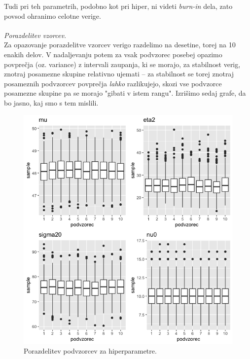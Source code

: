 \documentclass[a4paper,11pt]{article}
\begin{document}
\noindent
Tudi pri teh parametrih, podobno kot pri hiper, ni videti \textit{burn-in} dela, zato povsod ohranimo celotne verige.
\\
\\
\textit{Porazdelitev vzorcev.}
\\
Za opazovanje porazdelitve vzorcev verigo razdelimo na desetine, torej na 10 enakih delov. 
V nadaljevanju potem za vsak podvzorec posebej opazimo povprečja (oz. variance) z intervali zaupanja, ki se morajo, za stabilnost verig, znotraj posamezne skupine relativno ujemati -- 
za stabilnost se torej znotraj posameznih podvzorcev povprečja \textit{lahko} razlikujejo, skozi vse podvzorce posamezne skupine pa se morajo "gibati v istem rangu".
Izrišimo sedaj grafe, da bo jasno, kaj smo s tem mislili.
\newpage
\begin{figure}[ht!]
    \centering
    \includegraphics[width = 150mm]{Slike/vzorci_hiper.png}
    \caption{Porazdelitev podvzorcev za hiperparametre.}
\end{figure}
\newpage
\end{document}

